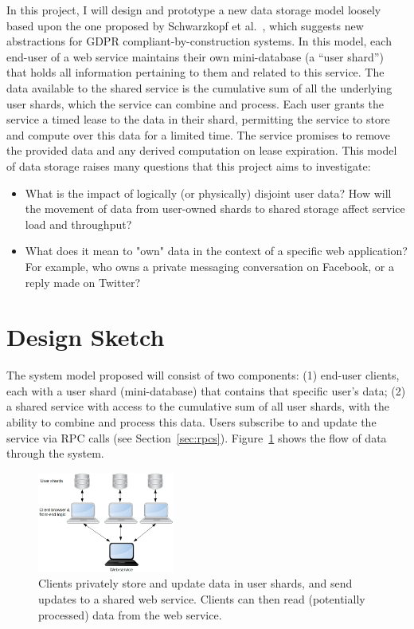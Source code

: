 \documentclass[letterpaper,twocolumn,10pt]{article}
\begin{document}
In this project, I will design and prototype a new data storage model loosely based upon the one proposed by Schwarzkopf et al.~\cite{positiongdpr}, which suggests new abstractions for GDPR compliant-by-construction systems. In this model, each end-user of a web service maintains their own mini-database (a ``user shard'') that holds all information pertaining to them and related to this service. The data available to the shared service is the cumulative sum of all the underlying user shards, which the
service can combine and process. Each user grants the service a timed lease to the data in their shard, permitting the service to store and compute over this data for a limited time. The service promises to remove the provided data and any derived computation on lease expiration.
This model of data storage raises many questions that this project aims to investigate:
\begin{itemize}
    \item What is the impact of logically (or physically) disjoint user data? How will the movement of data from user-owned shards to shared storage affect service load and throughput?
    \item What does it mean to "own" data in the context of a specific web application? For example, who owns a private messaging conversation on Facebook, or a reply made on Twitter?
\end{itemize}

\section{Design Sketch}
The system model proposed will consist of two components: 
(1) end-user clients, each with a user shard (mini-database) that contains
that specific user's data; 
(2) a shared service with access to the cumulative sum of all user shards, with the ability to combine and process this data.
Users subscribe to and update the service via RPC calls (see Section~\ref{sec:rpcs}).
Figure~\ref{fig:design} shows the flow of data through the system.

\begin{figure}
    \centering
    \includegraphics[width=0.4\textwidth]{usershards}
    \caption{Clients privately store and update data in user shards, and send updates to a shared web service. Clients can then read (potentially processed) data from the web service.}
    \label{fig:design}
\end{figure}
\end{document}
